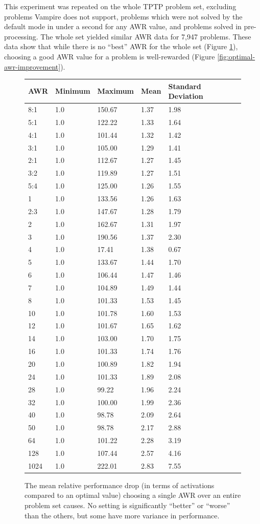 \documentclass{llncs}
\begin{document}
This experiment was repeated on the whole TPTP problem set, excluding problems Vampire does not support, problems which were not solved by the default mode in under a second for any AWR value, and problems solved in pre-processing.
The whole set yielded similar AWR data for 7,947 problems.
These data show that while there is no ``best'' AWR for the whole set (Figure \ref{fig:no-best-awr}), choosing a good AWR value for a problem is well-rewarded (Figure \ref{fig:optimal-awr-improvement}).

\begin{figure}
	\centering
	\begin{tabular}{l l l l l}
AWR & Minimum & Maximum & Mean & Standard Deviation\\
\hline
8:1 & 1.0 & 150.67 & 1.37 & 1.98\\
5:1 & 1.0 & 122.22 & 1.33 & 1.64\\
4:1 & 1.0 & 101.44 & 1.32 & 1.42\\
3:1 & 1.0 & 105.00 & 1.29 & 1.41\\
2:1 & 1.0 & 112.67 & 1.27 & 1.45\\
3:2 & 1.0 & 119.89 & 1.27 & 1.51\\
5:4 & 1.0 & 125.00 & 1.26 & 1.55\\
1 & 1.0 & 133.56 & 1.26 & 1.63\\
2:3 & 1.0 & 147.67 & 1.28 & 1.79\\
2 & 1.0 & 162.67 & 1.31 & 1.97\\
3 & 1.0 & 190.56 & 1.37 & 2.30\\
4 & 1.0 & 17.41 & 1.38 & 0.67\\
5 & 1.0 & 133.67 & 1.44 & 1.70\\
6 & 1.0 & 106.44 & 1.47 & 1.46\\
7 & 1.0 & 104.89 & 1.49 & 1.44\\
8 & 1.0 & 101.33 & 1.53 & 1.45\\
10 & 1.0 & 101.78 & 1.60 & 1.53\\
12 & 1.0 & 101.67 & 1.65 & 1.62\\
14 & 1.0 & 103.00 & 1.70 & 1.75\\
16 & 1.0 & 101.33 & 1.74 & 1.76\\
20 & 1.0 & 100.89 & 1.82 & 1.94\\
24 & 1.0 & 101.33 & 1.89 & 2.08\\
28 & 1.0 & 99.22 & 1.96 & 2.24\\
32 & 1.0 & 100.00 & 1.99 & 2.36\\
40 & 1.0 & 98.78 & 2.09 & 2.64\\
50 & 1.0 & 98.78 & 2.17 & 2.88\\
64 & 1.0 & 101.22 & 2.28 & 3.19\\
128 & 1.0 & 107.44 & 2.57 & 4.16\\
1024 & 1.0 & 222.01 & 2.83 & 7.55
	\end{tabular}
	\caption{The mean relative performance drop (in terms of activations compared to an optimal value) choosing a single AWR over an entire problem set causes. No setting is significantly ``better'' or ``worse'' than the others, but some have more variance in performance.}
	\label{fig:no-best-awr}
\end{figure}
\end{document}
